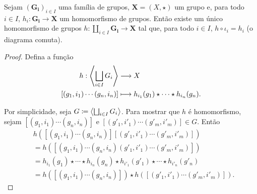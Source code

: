 \begin{prop}
Sejam $(\bm{G_i})_{i \in I}$ uma família de grupos, $\bm X = (X,\star)$ um grupo e, para todo $i \in I$, $h_i: \bm{G_i} \to \bm X$ um homomorfismo de grupos. Então existe um único homomorfismo de grupos $h: \coprod_{i \in I} \bm{G_i} \to \bm X$ tal que, para todo $i \in I$, $h \circ \iota_i = h_i$ (o diagrama comuta).
\begin{figure}
\centering
{}
\end{figure}
\end{prop}
\begin{proof}
Defina a função
	\begin{align*}
	{h}: {\left\langle \bigsqcup_{i \in I} G_i \right\rangle} &\longrightarrow {X} \\{\left[(g_1,i_1) \cdots (g_n,i_n)\right]} &\longmapsto {h_{i_1}(g_1) \star \cdots \star h_{i_n}(g_n)}.
	\end{align*}

Por simplicidade, seja $G \coloneqq \left\langle \bigsqcup_{i \in I} G_i \right\rangle$. Para mostrar que $h$ é homomorfismo, sejam $[(g_1,i_1) \cdots (g_n,i_n)]$ e $[(g'_1,i'_1) \cdots (g'_m,i'_m)] \in G$. Então
	\begin{align*}
	&h([(g_1,i_1) \cdots (g_n,i_n)][(g'_1,i'_1) \cdots (g'_m,i'_m)]) \\
		&= h([(g_1,i_1) \cdots (g_n,i_n)(g'_1,i'_1) \cdots (g'_m,i'_m)]) \\
		&= h_{i_1}(g_1) \star \cdots \star h_{i_n}(g_n) \star h_{i'_1}(g'_1) \star \cdots \star h_{i'_n}(g'_n) \\
		&= h([(g_1,i_1) \cdots (g_n,i_n)]) \star h([(g'_1,i'_1) \cdots (g'_m,i'_m)]).
	\end{align*}
\end{proof}









































